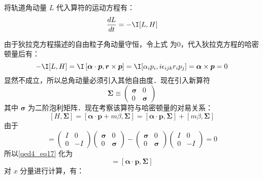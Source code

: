 将轨道角动量 $L$ 代入算符的运动方程有：
\begin{equation}\label{qed4_eq16}
\frac{d {L}}{d t}=- \I[L,H]
\end{equation}

由于狄拉克方程描述的自由粒子角动量守恒，令上式 为0，代入狄拉克方程的哈密顿量后有：
\begin{equation}\label{qed4_eq18}
- \I[L,H]=
 \I\left[\boldsymbol{\alpha} \cdot \boldsymbol{p},\boldsymbol{r} \times \boldsymbol{p}\right]
= \I[\alpha_ip_i,i\epsilon_{ijk}r_ip_j]=\boldsymbol{\alpha} \times \boldsymbol{p}=0
\end{equation}
显然不成立，所以总角动量必须引入其他自由度．现在引入新算符
\begin{equation}
\boldsymbol{\Sigma} \equiv\left(\begin{array}{cc}
\boldsymbol{\sigma} & 0 \\
0 & \boldsymbol{\sigma}
\end{array}\right)
\end{equation}
其中 $\boldsymbol{\sigma}$ 为二阶泡利矩阵．现在考察该算符与哈密顿量的对易关系：
\begin{equation}\label{qed4_eq17}
[H, \mathbf{\Sigma}]=[\boldsymbol{\alpha} \cdot \boldsymbol{p}+m\beta , \boldsymbol{\Sigma}]=[\boldsymbol{\alpha} \cdot \boldsymbol{p}, \boldsymbol{\Sigma}]+[m\beta , \boldsymbol{\Sigma}]
\end{equation}
由于\begin{equation}
[\beta m, \mathbf{\Sigma}]=\left(\begin{array}{cc}
I & 0 \\
0 & -I
\end{array}\right)\left(\begin{array}{cc}
\boldsymbol{\sigma} & 0 \\
0 & \boldsymbol{\sigma}
\end{array}\right)-\left(\begin{array}{cc}
\boldsymbol{\sigma} & 0 \\
0 & \boldsymbol{\sigma}
\end{array}\right)\left(\begin{array}{cc}
I & 0 \\
0 & -I
\end{array}\right)=0
\end{equation}
所以\autoref{qed4_eq17} 化为
\begin{equation}
[H, \Sigma]=[\boldsymbol{\alpha} \cdot \boldsymbol{p}, \boldsymbol{\Sigma}]
\end{equation}
对 $x$ 分量进行计算，有：
